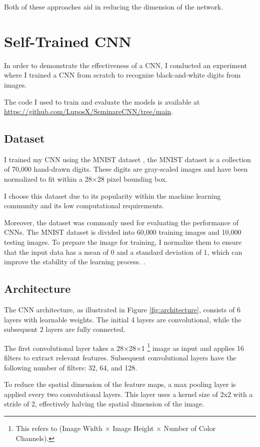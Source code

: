 Both of these approaches aid in reducing the dimension of the network.

\section{Self-Trained CNN}

In order to demonstrate the effectiveness of a CNN, I conducted an experiment where I trained a CNN from scratch to recognize black-and-white digits from images.

The code I used to train and evaluate the models is available at \url{https://github.com/LuposX/SeminareCNN/tree/main}.

\subsection{Dataset}


I trained my CNN using the MNIST dataset \citep{CNNLeCunDocumentRecog}, the MNIST dataset is a collection of 70,000 hand-drawn digits. 
These digits are gray-scaled images and have been normalized to fit within a 28×28 pixel bounding box.

I choose this dataset due to its popularity within the machine learning community and its low computational requirements.

Moreover, the dataset was commonly used for evaluating the performance of CNNs.
The MNIST  dataset is divided into 60,000 training images and 10,000 testing images.
To prepare the image for training, I normalize them to ensure that the input data has a mean of 0 and a standard deviation of 1, which can improve the stability of the learning process. \citep{589532}.

\subsection{Architecture}

The CNN architecture, as illustrated in Figure \ref{fig:architecture}, consists of 6 layers with learnable weights. The initial 4 layers are convolutional, while the subsequent 2 layers are fully connected.

The first convolutional layer takes a 28×28×1 \footnote{This refers to (Image Width $\times$ Image Height $\times$ Number of Color Channels).} image as input and applies 16 filters to extract relevant features.
Subsequent convolutional layers have the following number of filters: 32, 64, and 128.

To reduce the spatial dimension of the feature maps, a max pooling layer is applied every two convolutional layers.
This layer uses a kernel size of 2x2 with a stride of 2, effectively halving the spatial dimension of the image.

